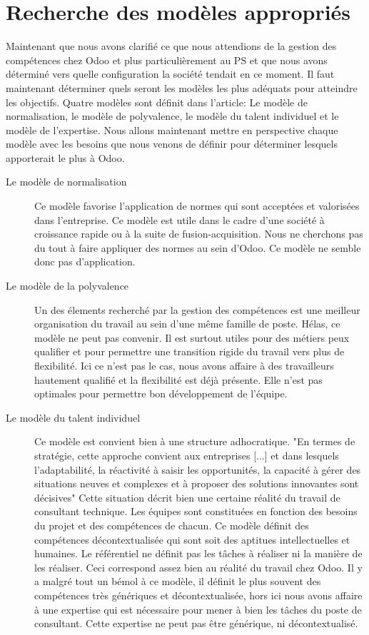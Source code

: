 \section{Recherche des modèles appropriés}
Maintenant que nous avons clarifié ce que nous attendions de la gestion des compétences chez Odoo et plus particulièrement au PS et que nous avons déterminé vers quelle configuration la société tendait en ce moment. Il faut maintenant déterminer quels seront les modèles les plus adéquats pour atteindre les objectifs. Quatre modèles sont définit dans l'article\citep[pp.39-49]{delobbe}: Le modèle de normalisation, le modèle de polyvalence, le modèle du talent individuel et le modèle de l'expertise. Nous allons maintenant mettre en perspective chaque modèle avec les besoins que nous venons de définir pour déterminer lesquels apporterait le plus à Odoo.
\begin{description}
  \item[Le modèle de normalisation]
  Ce modèle favorise l'application de normes qui sont acceptées et valorisées dans l'entreprise. Ce modèle est utile dans le cadre d'une société à croissance rapide ou à la suite de fusion-acquisition. Nous ne cherchons pas du tout à faire appliquer des normes au sein d'Odoo. Ce modèle ne semble donc pas d'application. 
  \item[Le modèle de la polyvalence]
  Un des élements recherché par la gestion des compétences est une meilleur organisation du travail au sein d'une même famille de poste. Hélas, ce modèle ne peut pas convenir. Il est surtout utiles pour des métiers peux qualifier et pour permettre une transition rigide du travail vers plus de flexibilité. Ici ce n'est pas le cas, nous avons affaire à des travailleurs hautement qualifié et la flexibilité est déjà présente. Elle n'est pas optimales pour permettre bon développement de l'équipe. 
  \item[Le modèle du talent individuel]
  Ce modèle est convient bien à une structure adhocratique. "En termes de stratégie, cette approche convient aux entreprises [...] et dans lesquels l'adaptabilité, la réactivité à saisir les opportunités, la capacité à gérer des situations neuves et complexes et à proposer des solutions innovantes sont décisives"\citep[pp.44]{delobbe} Cette situation décrit bien une certaine réalité du travail de consultant technique. Les équipes sont constituées en fonction des besoins du projet et des compétences de chacun. Ce modèle définit des compétences décontextualisée qui sont soit des aptitues intellectuelles et humaines. Le référentiel ne définit pas les tâches à réaliser ni la manière de les réaliser. Ceci correspond assez bien au réalité du travail chez Odoo. Il y a malgré tout un bémol à ce modèle, il définit le plus souvent des compétences très génériques et décontextualisée, hors ici nous avons affaire à une expertise qui est nécessaire pour mener à bien les tâches du poste de consultant. Cette expertise ne peut pas être générique, ni décontextualisé. 

\end{description}
